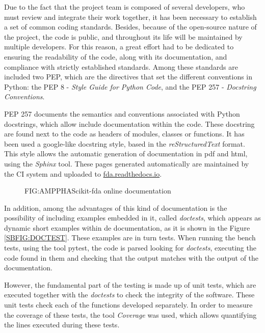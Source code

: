 

Due to the fact that the project team is composed of several developers, who
must review and integrate their work together, it has been necessary to
establish a set of common coding standards.
Besides, because of the open-source nature of the project, the code is
public, and throughout its life will be maintained by multiple developers. For
this reason, a great effort had to be dedicated to ensuring the readability of
the code, along with its documentation, and compliance with strictly established
standards. Among these standards are included two \ac{PEP}, which are the directives that set the different conventions in Python:
the \ac{PEP} 8 - \textit{Style Guide for Python Code}, and the \acs{PEP} 257 - \textit{Docstring Conventions}.

\acs{PEP} 257 documents the semantics and conventions associated with Python
docstrings, which allow include documentation within the code. These docstring
are found next to the code as headers of modules, classes or functions. It has
been used a google-like docstring style, based in the \textit{reStructuredText} format.
This style allows the automatic generation of documentation in pdf and html,
using the \textit{Sphinx} tool. These pages generated automatically are maintained by
the \ac{CI} system and uploaded to
\href{https://fda.readthedocs.io/}{fda.readthedocs.io}.

\begin{figure}[Scikit-fda online documentation]{FIG:AMPPHA}{Scikit-fda online documentation}
   \quad
\end{figure}

In addition, among the advantages of this kind of documentation is the
possibility of including examples embedded in it, called \textit{doctests}, which appears
 as dynamic short examples within de documentation, as it is shown in the
 Figure \ref{SBFIG:DOCTEST}.
These examples are in turn tests. When running the bench tests, using the tool
pytest, the code is parsed looking for \textit{doctests}, executing the code found in
them and checking that the output matches with the output of the documentation.

However, the fundamental part of the testing is made up of unit tests, which are
executed together with the \textit{doctests} to check the integrity of the software.
These unit tests check each of the functions developed separately. In order to measure the coverage of these tests, the tool \textit{Coverage} was used, which allows quantifying the lines executed during these tests.

